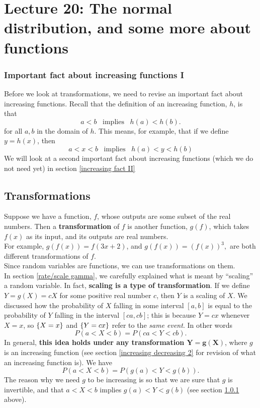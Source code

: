 \chapter{Lecture 20: The normal distribution, and some more about functions}

\subsection{Important fact about increasing functions I} \label{increasing fact I}
Before we look at transformations, we need to revise an important fact about increasing functions. Recall that the definition of an increasing function, $h$, is that
\[
a < b \;\;\; \text{implies} \;\;\; h(a) < h(b).
\]
for all $a,b$ in the domain of $h$. This means, for example, that if we define $y = h(x)$, then
\[
a < x < b \;\;\; \text{implies} \;\;\; h(a) < y < h(b)
\]
We will look at a second important fact about increasing functions (which we do not need yet) in section \ref{increasing fact II}

\section{Transformations} \label{transformation, functions} \label{def Y = g(X)}
\noindent Suppose we have a function, $f$, whose outputs are some subset of the real numbers. Then a \textbf{transformation} of $f$ is another function, $g(f)$, which takes $f(x)$ as its input, and its outputs are real numbers. \\

\noindent For example, $g(f(x)) = f(3x+2)$, and $g(f(x)) = (f(x))^3,$ are both different transformations of $f$. \\

\noindent Since random variables are functions, we can use transformations on them. \\

\noindent In section \ref{rate/scale gamma}, we carefully explained what is meant by ``scaling'' a random variable. In fact, \textbf{scaling is a type of transformation}. If we define $Y = g(X) = cX$ for some positive real number $c$, then $Y$ is a scaling of $X$. We discussed how the probability of $X$ falling in some interval $[a,b]$ is equal to the probability of $Y$ falling in the interval $[ca,cb]$; this is because $Y = cx$ whenever $X = x$, so $\left\{X = x\right\}$ and $\left\{Y = cx\right\}$ refer to the \textit{same event}. In other words
\[
P(a < X < b) = P(ca < Y < cb).
\]
\noindent In general, \textbf{this idea holds under any transformation $\boldsymbol{Y = g(X)}$}, where $g$ is an increasing function (see section \ref{increasing decreasing 2} for revision of what an increasing function is). We have
\[
P(a < X < b) = P(g(a) < Y < g(b)).
\]
The reason why we need $g$ to be increasing is so that we are sure that $g$ is invertible, and that $a < X < b$ implies $g(a) < Y < g(b)$ (see section \ref{increasing fact I} above). \\

